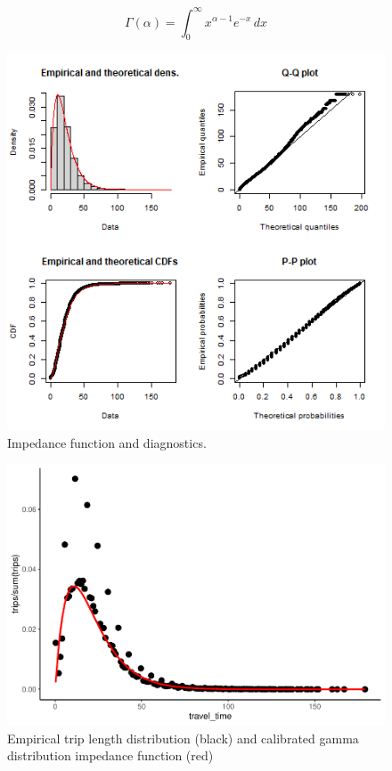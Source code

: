 \documentclass[]{elsarticle} %
\begin{document}
\[
\Gamma(\alpha) =  \int_{0}^{\infty} x^{\alpha-1}e^{-x} \,dx
\]

\begin{figure}
\includegraphics[width=1\linewidth]{images/impedance_function} \caption{\label{fig:impedance-function-plot}Impedance function and diagnostics.}\label{fig:plot-impedance-function}
\end{figure}

\begin{figure}
\includegraphics[width=1\linewidth]{Spatial-Availability_files/figure-latex/TLD-Gamma-plot-1} \caption{\label{fig:TLD-Gamma-plot}Empirical trip length distribution (black) and calibrated gamma distribution impedance function (red)}\label{fig:TLD-Gamma-plot}
\end{figure}
\end{document}
